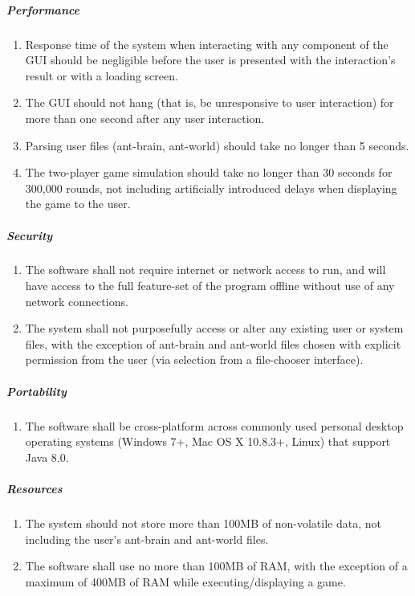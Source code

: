 \documentclass[11pt]{article}
\providecommand{\tightlist}{%
  \setlength{\itemsep}{0pt}\setlength{\parskip}{0pt}}
\begin{document}
\subparagraph{Performance}\label{performance}

\begin{enumerate}
\def\labelenumi{\arabic{enumi}.}
\tightlist
\item
  Response time of the system when interacting with any component of the
  GUI should be negligible before the user is presented with the
  interaction's result or with a loading screen.
\item
  The GUI should not hang (that is, be unresponsive to user interaction)
  for more than one second after any user interaction.
\item
  Parsing user files (ant-brain, ant-world) should take no longer than 5
  seconds.
\item
  The two-player game simulation should take no longer than 30 seconds
  for 300,000 rounds, not including artificially introduced delays when
  displaying the game to the user.
\end{enumerate}

\subparagraph{Security}\label{security}

\begin{enumerate}
\def\labelenumi{\arabic{enumi}.}
\tightlist
\item
  The software shall not require internet or network access to run, and
  will have access to the full feature-set of the program offline
  without use of any network connections.
\item
  The system shall not purposefully access or alter any existing user or
  system files, with the exception of ant-brain and ant-world files
  chosen with explicit permission from the user (via selection from a
  file-chooser interface).
\end{enumerate}

\subparagraph{Portability}\label{portability}

\begin{enumerate}
\def\labelenumi{\arabic{enumi}.}
\tightlist
\item
  The software shall be cross-platform across commonly used personal
  desktop operating systems (Windows 7+, Mac OS X 10.8.3+, Linux) that
  support Java 8.0.
\end{enumerate}

\subparagraph{Resources}\label{resources}

\begin{enumerate}
\def\labelenumi{\arabic{enumi}.}
\tightlist
\item
  The system should not store more than 100MB of non-volatile data, not
  including the user's ant-brain and ant-world files.
\item
  The software shall use no more than 100MB of RAM, with the exception
  of a maximum of 400MB of RAM while executing/displaying a game.
\end{enumerate}
\end{document}
